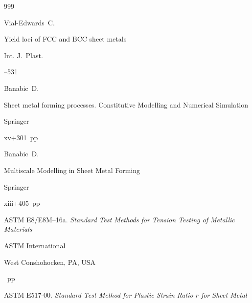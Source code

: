 \begin{thebibliography}{999}

\by Vial-Edwards~C.

\paper Yield loci of FCC and BCC sheet metals

\jour Int. J.~Plast.




--531






\by Banabic~D.

\book Sheet metal forming processes. Constitutive Modelling and Numerical Simulation


\publ Springer

\totalpages xv+301~pp \nofrills






\eds Banabic~D.

\book Multiscale Modelling in Sheet Metal Forming


\publ Springer

\totalpages xiii+405~pp \nofrills






\thesis \rm ASTM E8/E8M--16a. \it Standard Test Methods for Tension Testing of Metallic Materials


\publ ASTM International

\publaddr West Conshohocken, PA, USA

~pp \nofrills





\thesis \rm ASTM E517-00. \it   Standard Test Method for Plastic Strain Ratio $r$ for Sheet Metal


\end{thebibliography}
